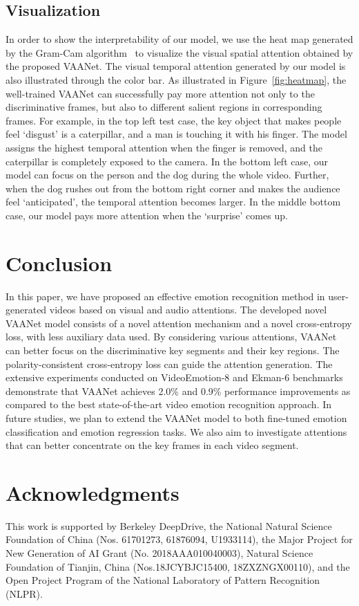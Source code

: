 \documentclass[letterpaper]{article} \usepackage{aaai20}  \usepackage{times}  \usepackage{helvet} \usepackage{courier}  \usepackage[hyphens]{url}  \usepackage{graphicx} \urlstyle{rm} \def\UrlFont{\rm}  \usepackage{graphicx}
\begin{document}
\subsection{Visualization}
\label{ssec:Visualization}
In order to show the interpretability of our model, we use the heat map generated by the Gram-Cam algorithm~\cite{selvaraju2017grad} to visualize the visual spatial attention obtained by the proposed VAANet. The visual temporal attention generated by our model is also illustrated through the color bar. As illustrated in Figure~\ref{fig:heatmap}, the well-trained VAANet can successfully pay more attention not only to the discriminative frames, but also to different salient regions in corresponding frames. For example, in the top left test case, the key object that makes people feel `disgust' is a caterpillar, and a man is touching it with his finger. The model assigns the highest temporal attention when the finger is removed, and the caterpillar is completely exposed to the camera. In the bottom left case, our model can focus on the person and the dog during the whole video. Further, when the dog rushes out from the bottom right corner and makes the audience feel `anticipated', the temporal attention becomes larger. In the middle bottom case, our model pays more attention when the `surprise' comes up.











\section{Conclusion}
\label{sec:Conclusion}
In this paper, we have proposed an effective emotion recognition method in user-generated videos based on visual and audio attentions. The developed novel VAANet model consists of a novel attention mechanism and a novel cross-entropy loss, with less auxiliary data used.
By considering various attentions, VAANet can better focus on the discriminative key segments and their key regions. The polarity-consistent cross-entropy loss can guide the attention generation. The extensive experiments conducted on VideoEmotion-8 and Ekman-6 benchmarks demonstrate that VAANet achieves 2.0\% and 0.9\% performance improvements as compared to the best state-of-the-art video emotion recognition approach. In future studies, we plan to extend the VAANet model to both fine-tuned emotion classification and emotion regression tasks. We also aim to investigate attentions that can better concentrate on the key frames in each video segment.
\section{ Acknowledgments}
This work is supported by Berkeley DeepDrive, the National Natural Science Foundation of China (Nos. 61701273, 61876094, U1933114), the Major Project for New Generation of AI Grant (No. 2018AAA010040003), Natural Science Foundation of Tianjin, China (Nos.18JCYBJC15400, 18ZXZNGX00110), and the Open Project Program of the National Laboratory of Pattern Recognition (NLPR).



\end{document}
